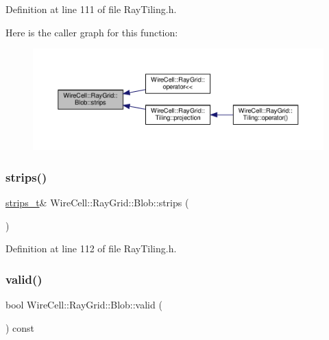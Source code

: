 Definition at line 111 of file Ray\+Tiling.\+h.

Here is the caller graph for this function\+:
\nopagebreak
\begin{figure}[H]
\begin{center}
\leavevmode
\includegraphics[width=350pt]{class_wire_cell_1_1_ray_grid_1_1_blob_a4334dac5e1c417337fc156c828036966_icgraph}
\end{center}
\end{figure}
\mbox{\label{class_wire_cell_1_1_ray_grid_1_1_blob_a357044cca3634e0eb681a5d5f2f1e58c}} 
\subsubsection{\texorpdfstring{strips()}{strips()}\hspace{0.1cm}{\footnotesize\ttfamily [2/2]}}
{\footnotesize\ttfamily \hyperlink{namespace_wire_cell_1_1_ray_grid_a06c9ce08c0358d22fae3185aff8a9b7c}{strips\+\_\+t}\& Wire\+Cell\+::\+Ray\+Grid\+::\+Blob\+::strips (\begin{DoxyParamCaption}{ }\end{DoxyParamCaption})\hspace{0.3cm}{\ttfamily [inline]}}



Definition at line 112 of file Ray\+Tiling.\+h.

\mbox{\label{class_wire_cell_1_1_ray_grid_1_1_blob_a54c443df9fc36be31985e8be787c5651}} 
\subsubsection{\texorpdfstring{valid()}{valid()}}
{\footnotesize\ttfamily bool Wire\+Cell\+::\+Ray\+Grid\+::\+Blob\+::valid (\begin{DoxyParamCaption}{ }\end{DoxyParamCaption}) const\hspace{0.3cm}{\ttfamily [inline]}}




